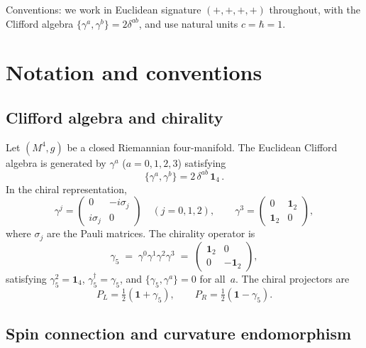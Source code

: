 \documentclass[12pt,a4paper]{article}
\theoremstyle{definition}
\theoremstyle{remark}
\begin{document}
Conventions: we work in Euclidean signature $(+,+,+,+)$ throughout, with the
Clifford algebra $\{\gamma^a, \gamma^b\} = 2\delta^{ab}$, and use natural
units $c = \hbar = 1$.


\section{Notation and conventions}
\label{sec:notation}

\subsection{Clifford algebra and chirality}

Let $(M^4, g)$ be a closed Riemannian four-manifold.  The Euclidean Clifford
algebra is generated by $\gamma^a$ ($a = 0,1,2,3$) satisfying
\begin{equation}\label{eq:clifford}
  \{\gamma^a, \gamma^b\} = 2\,\delta^{ab}\,\mathbf{1}_4\,.
\end{equation}
In the chiral representation,
\begin{equation}
  \gamma^j = \begin{pmatrix} 0 & -i\sigma_j \\ i\sigma_j & 0 \end{pmatrix}
  \quad (j = 0,1,2), \qquad
  \gamma^3 = \begin{pmatrix} 0 & \mathbf{1}_2 \\ \mathbf{1}_2 & 0 \end{pmatrix},
\end{equation}
where $\sigma_j$ are the Pauli matrices.  The chirality operator is
\begin{equation}\label{eq:g5}
  \gamma_5 \;=\; \gamma^0 \gamma^1 \gamma^2 \gamma^3
  \;=\; \begin{pmatrix} \mathbf{1}_2 & 0 \\ 0 & -\mathbf{1}_2 \end{pmatrix},
\end{equation}
satisfying $\gamma_5^2 = \mathbf{1}_4$, $\gamma_5^\dagger = \gamma_5$, and
$\{\gamma_5, \gamma^a\} = 0$ for all~$a$.  The chiral projectors are
\begin{equation}
  P_L = \tfrac{1}{2}(\mathbf{1} + \gamma_5), \qquad
  P_R = \tfrac{1}{2}(\mathbf{1} - \gamma_5).
\end{equation}

\subsection{Spin connection and curvature endomorphism}
\end{document}
